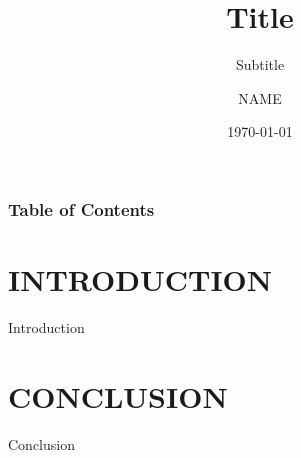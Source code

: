 \documentclass[10pt]{beamer}
\title[The Hong Kong University of Science and Technology]{\textrm{\textbf{Title}}}
\subtitle{\textrm{Subtitle}}
\author[NAME]{\textrm{NAME}}
\institute[@connect.ust.hk]{\textrm{The Hong Kong University of Science and Technology}}
\date[\today]{\textrm{\today}}
\begin{document}
\frame{\titlepage}
\begin{frame}
\frametitle{\textrm{Table of Contents}}
\tableofcontents
\end{frame}
\section{\textrm{INTRODUCTION}}
    \begin{frame}{\textrm{Introduction}}
    
    \end{frame}


\section{\textrm{CONCLUSION}}
    \begin{frame}{\textrm{Conclusion}}
    \end{frame}

\section*{}  
\begin{frame}
\textcolor{hkustblue}{\Huge{}}
\end{frame}
\end{document}

